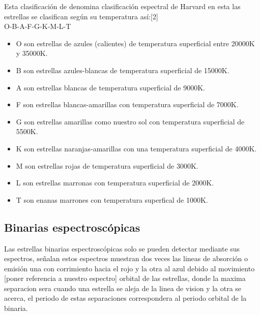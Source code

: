 \documentclass[Proceedings]{ascelike}
\begin{document}
Esta clasificaci\'on de denomina clasificaci\'on espectral de Harvard en esta las estrellas se clasifican seg\'un su temperatura as\'i:[2]\\

O-B-A-F-G-K-M-L-T\\

\begin{itemize}

\item O son estrellas de azules (calientes) de temperatura superficial entre 20000K y 35000K.\\
\item B son estrellas azules-blancas de temperatura superficial de 15000K.\\
\item A son estrellas blancas de temperatura superficial de 9000K.\\
\item F son estrellas blancas-amarillas con temperatura superficial de 7000K.\\
\item G son estrellas amarillas como nuestro sol con temperatura superficial de 5500K.\\
\item K son estrellas naranjas-amarillas con una temperatura superficial de 4000K.\\
\item M son estrellas rojas de temperatura superficial de 3000K.\\
\item L son estrellas marronas con temperatura superficial de 2000K.\\
\item T son enanas marrones con temperatura superfical de 1000K.\\
\end{itemize}


\subsection{Binarias espectrosc\'opicas}

Las estrellas binarias espectrosc\'opicas solo se pueden detectar mediante sus espectros,  señalan
estos espectros muestran dos veces las lineas de absorci\'on o emisi\'on una con corrimiento hacia 
el rojo y la otra al azul debido al movimiento [poner referencia a nuestro espectro]
orbital de las estrellas, donde la maxima separacion sera cuando una estrella se aleja de la
linea de vision y la otra se acerca, el periodo de estas separaciones correspondera al periodo
orbital de la binaria.
\end{document}
